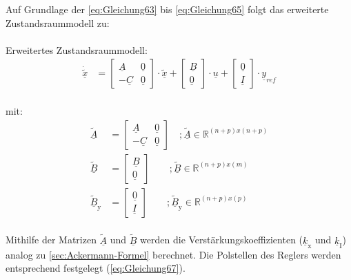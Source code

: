 \documentclass[
	pagesize,
	fontsize=12pt,
	paper=a4,
	oneside,
   reqno
]{scrartcl}
\begin{document}
Auf Grundlage der \autoref{eq:Gleichung63} bis \autoref{eq:Gleichung65} folgt das erweiterte Zustandsraummodell zu:\\\\
Erweitertes Zustandsraummodell:
\begin{align}\label{eq:Gleichung66}
    \underline{\dot{\tilde{x}}} &= 
    \begin{bmatrix}
        \underline{A} & \underline{0} \\
        -\underline{C} & \underline{0}
    \end{bmatrix} \cdot \underline{\tilde{x}} +
    \begin{bmatrix}
        \underline{B} \\
        \underline{0}
    \end{bmatrix} \cdot\underline{u} +
    \begin{bmatrix}
        \underline{0} \\
        \underline{I}
    \end{bmatrix} \cdot\underline{y}_{ref}
\end{align}\\
mit:
\begin{align*}
    \underline{\tilde{A}} &= 
    \begin{bmatrix}
        \underline{A} & \underline{0} \\
        -\underline{C} & \underline{0}
    \end{bmatrix} \quad ; \underline{\tilde{A}}\in\mathbb{R}^{(n+p)x(n+p)}\\
    \underline{\tilde{B}} &= 
    \begin{bmatrix}
        \underline{B} \\
        \underline{0}
    \end{bmatrix}\qquad ; \underline{\tilde{B}}\in\mathbb{R}^{(n+p)x(m)}\\
    \underline{\tilde{B}}_{\mathrm{y}} &= 
    \begin{bmatrix}
        \underline{0} \\
        \underline{I}
    \end{bmatrix}\qquad  ;\underline{\tilde{B}}_{\mathrm{y}}\in\mathbb{R}^{(n+p)x(p)}
\end{align*}\\
Mithilfe der Matrizen $\underline{\tilde{A}}$ und $\underline{\tilde{B}}$ werden die Verstärkungskoeffizienten ($\underline{k}_{\mathrm{x}}$ und $\underline{k}_{\mathrm{I}}$) analog zu \autoref{sec:Ackermann-Formel} berechnet. Die Polstellen des Reglers werden entsprechend festgelegt (\autoref{eq:Gleichung67}).
\end{document}

